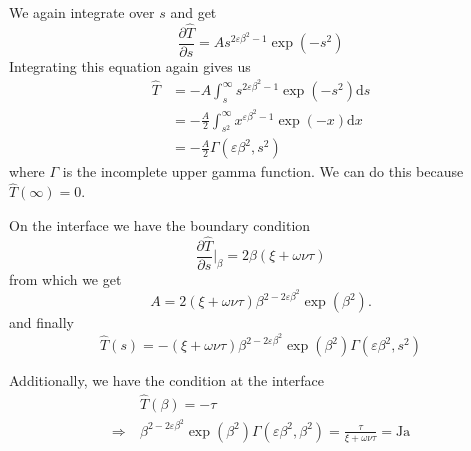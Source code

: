 \documentclass{article}
\numberwithin{equation}{section}
\newcommand{\dd}{\mathrm{d}}
\newcommand{\pd}[2]{\dfrac{\partial #1}{\partial #2}}
\newcommand{\dimless}[1]{\hat{#1}}
\begin{document}
We again integrate over $s$ and get
\begin{equation}
    \pd{\dimless{T}}{s} = A s^{2\varepsilon \beta^2 - 1} \exp\left(-s^2\right)
\end{equation}
Integrating this equation again gives us
\begin{equation}
    \begin{split}
        \dimless{T}
        &= -A \int_s^\infty s^{2\varepsilon\beta^2 - 1} \exp\left(-s^2\right) \dd s \\
        &= -\frac{A}{2} \int_{s^2}^\infty x^{\varepsilon\beta^2 - 1} \exp\left(-x\right) \dd x \\
        &= -\frac{A}{2} \Gamma(\varepsilon \beta^2, s^2)
    \end{split}
\end{equation}
where $\Gamma$ is the incomplete upper gamma function.
We can do this because $\dimless{T}(\infty) = 0$.

On the interface we have the boundary condition
\begin{equation}
    \pd{\dimless{T}}{s}\bigg|_\beta = 2 \beta (\xi + \omega \nu \tau)
\end{equation}
from which we get
\begin{equation}
    A = 2 (\xi + \omega \nu \tau)
        \beta^{2 - 2 \varepsilon \beta^2}
        \exp\left(\beta^2\right).
\end{equation}
and finally
\begin{equation}
    \dimless{T}(s) =
    -(\xi + \omega \nu \tau)
        \beta^{2 - 2 \varepsilon \beta^2}
        \exp\left(\beta^2\right)
        \Gamma(\varepsilon \beta^2, s^2)
\end{equation}

Additionally, we have the condition at the interface
\begin{equation}
    \begin{split}
        &\dimless{T}(\beta) = -\tau \\
        \Rightarrow\ &
        \beta^{2 - 2 \varepsilon \beta^2}
          \exp\left(\beta^2\right)
          \Gamma(\varepsilon \beta^2, \beta^2)
        = \frac{\tau}{\xi + \omega \nu \tau} = \text{Ja}
    \end{split}
\end{equation}
\end{document}
